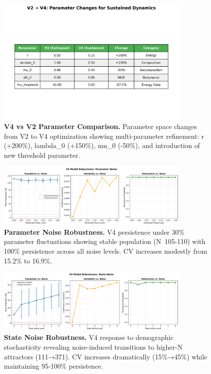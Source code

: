 \documentclass[
]{article}
\begin{document}
\begin{figure}[htbp]
\centering
\includegraphics[width=0.85\textwidth]{figures/paper7_fig7_v4_vs_v2_parameters.png}
\caption{\textbf{V4 vs V2 Parameter Comparison.} Parameter space changes from V2 to V4 optimization showing multi-parameter refinement: r (+200\%), lambda\_0 (+150\%), mu\_0 (-50\%), and introduction of new threshold parameter.}
\label{fig:v4-parameters}
\end{figure}

\begin{figure}[htbp]
\centering
\includegraphics[width=0.85\textwidth]{figures/paper7_fig8_robustness_parameter.png}
\caption{\textbf{Parameter Noise Robustness.} V4 persistence under 30\% parameter fluctuations showing stable population (N~105-110) with 100\% persistence across all noise levels. CV increases modestly from 15.2\% to 16.9\%.}
\label{fig:robustness-parameter}
\end{figure}

\begin{figure}[htbp]
\centering
\includegraphics[width=0.85\textwidth]{figures/paper7_fig9_robustness_state.png}
\caption{\textbf{State Noise Robustness.} V4 response to demographic stochasticity revealing noise-induced transitions to higher-N attractors (111→371). CV increases dramatically (15\%→45\%) while maintaining 95-100\% persistence.}
\label{fig:robustness-state}
\end{figure}
\end{document}
